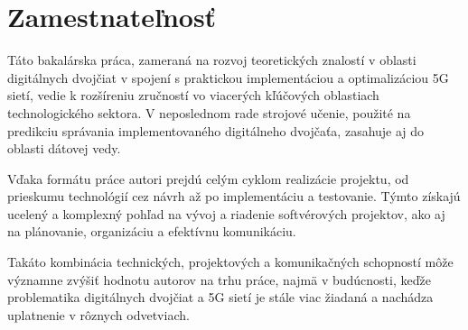 \section{Zamestnateľnosť}
\par{
Táto bakalárska práca, zameraná na rozvoj teoretických znalostí v oblasti digitálnych dvojčiat v spojení s praktickou implementáciou a optimalizáciou 5G sietí, vedie k rozšíreniu zručností vo viacerých kľúčových oblastiach technologického sektora. V neposlednom rade strojové učenie, použité na predikciu správania implementovaného digitálneho dvojčaťa, zasahuje aj do oblasti dátovej vedy.

Vďaka formátu práce autori prejdú celým cyklom realizácie projektu, od prieskumu technológií cez návrh až po implementáciu a testovanie. Týmto získajú ucelený a komplexný pohľad na vývoj a riadenie softvérových projektov, ako aj na plánovanie, organizáciu a efektívnu komunikáciu.

Takáto kombinácia technických, projektových a komunikačných schopností môže významne zvýšiť hodnotu autorov na trhu práce, najmä v budúcnosti, keďže problematika digitálnych dvojčiat a 5G sietí je stále viac žiadaná a nachádza uplatnenie v rôznych odvetviach.
}
